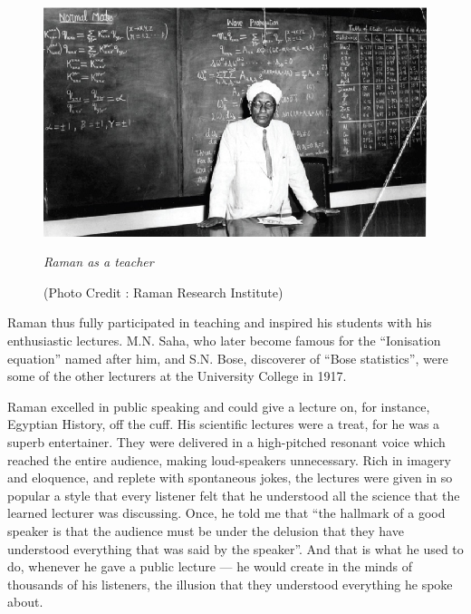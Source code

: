 \begin{figure}[t]
\centering
\includegraphics{eps/14.eps}

{\fontsize{10pt}{12pt}\selectfont \em Raman as a teacher}\relax

{\fontsize{10pt}{12pt}\selectfont (Photo Credit : Raman Research Institute)}\relax
\end{figure}

Raman thus fully participated in teaching and inspired his students with his enthusiastic lectures. M.N. Saha, who later become famous for the ``Ionisation equation'' named after him, and S.N. Bose, discoverer of ``Bose statistics'', were some of the other lecturers at the University College in 1917.

\medskip
{}
\smallskip


\noindent
Raman excelled in public speaking and could give a lecture on, for instance, Egyptian History, off the cuff. His scientific lectures were a treat, for he was a superb entertainer. They were delivered in a high-pitched resonant voice which reached the entire audience, making loud-speakers unnecessary. Rich in imagery and eloquence, and replete with spontaneous jokes, the lectures were given in so popular a style that every listener felt that he understood all the science that the learned lecturer was discussing. Once, he told me that ``the hallmark of a good speaker is that the audience must be under the delusion that they have understood everything that was said by the speaker''. And that is what he used to do, whenever he gave a public lecture --- he would create in the minds of thousands of his listeners, the illusion that they understood everything he spoke about.


